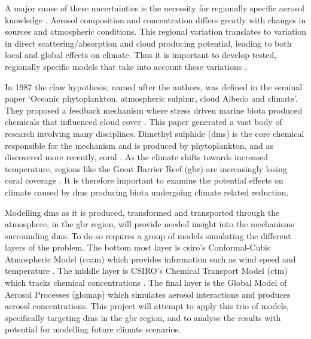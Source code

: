 A major cause of these uncertainties is the necessity for regionally specific aerosol knowledge \citep{intergovernmentalpanelonclimatechange:2015fa}. Aerosol composition and concentration differs greatly with changes in sources and atmospheric conditions. This regional variation translates to variation in direct scattering/absorption and cloud producing potential, leading to both local and global effects on climate. Thus it is important to develop tested, regionally specific models that take into account these variations \citep{cainey:2007jj, simpson:2014}. 

In 1987 the \gls{claw} hypothesis, named after the authors, was defined in the seminal paper `Oceanic phytoplankton, atmospheric sulphur, cloud Albedo and climate'. They proposed a feedback mechanism where stress driven marine biota produced chemicals that influenced cloud cover \citep{charlson:1987fw}. This paper generated a vast body of research involving many disciplines. Dimethyl sulphide (\gls{dms}) is the core chemical responsible for the mechanism and is produced by phytoplankton, and as discovered more recently, coral \citep{raina:2013fj}. As the climate shifts towards increased temperature, regions like the Great Barrier Reef (\gls{gbr}) are increasingly losing coral coverage \citep{hoeghguldberg:1999bi}. It is therefore important to examine the potential effects on climate caused by \gls{dms} producing biota undergoing climate related reduction.

Modelling \gls{dms} as it is produced, transformed and transported through the atmosphere, in the \gls{gbr} region, will provide needed insight into the mechanisms surrounding \gls{dms}. To do so requires a group of models simulating the different layers of the problem. The bottom most layer is \gls{csiro}'s Conformal-Cubic Atmospheric Model (\gls{ccam}) which provides information such as wind speed and temperature \citep{mcgregor:2005wz}. The middle layer is CSIRO's Chemical Transport Model (\gls{ctm}) which tracks chemical concentrations \citep{cope:2009tz}. The final layer is the Global Model of Aerosol Processes (\gls{glomap}) which simulates aerosol interactions and produces aerosol concentrations. This project will attempt to apply this trio of models, specifically targeting \gls{dms} in the \gls{gbr} region, and to analyse the results with potential for modelling future climate scenarios.


